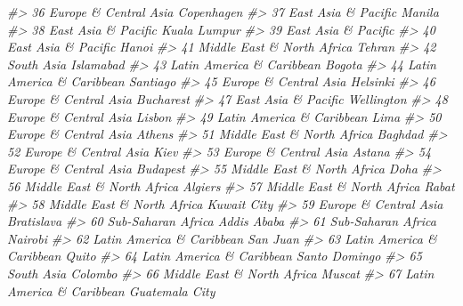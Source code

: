 \documentclass[
  xelatex, ja=standard]{bxjsbook}
\newenvironment{Shaded}{\begin{snugshade}}{\end{snugshade}}
\newcommand{\CommentTok}[1]{\textcolor[rgb]{0.56,0.35,0.01}{\textit{#1}}}
\theoremstyle{definition}
\theoremstyle{definition}
\theoremstyle{definition}
\theoremstyle{definition}
\theoremstyle{remark}
\begin{document}
\begin{Shaded}
\begin{Highlighting}[]
\CommentTok{\#\textgreater{} 36       Europe \& Central Asia          Copenhagen}
\CommentTok{\#\textgreater{} 37         East Asia \& Pacific              Manila}
\CommentTok{\#\textgreater{} 38         East Asia \& Pacific        Kuala Lumpur}
\CommentTok{\#\textgreater{} 39         East Asia \& Pacific                    }
\CommentTok{\#\textgreater{} 40         East Asia \& Pacific               Hanoi}
\CommentTok{\#\textgreater{} 41  Middle East \& North Africa              Tehran}
\CommentTok{\#\textgreater{} 42                  South Asia           Islamabad}
\CommentTok{\#\textgreater{} 43   Latin America \& Caribbean              Bogota}
\CommentTok{\#\textgreater{} 44   Latin America \& Caribbean            Santiago}
\CommentTok{\#\textgreater{} 45       Europe \& Central Asia            Helsinki}
\CommentTok{\#\textgreater{} 46       Europe \& Central Asia           Bucharest}
\CommentTok{\#\textgreater{} 47         East Asia \& Pacific          Wellington}
\CommentTok{\#\textgreater{} 48       Europe \& Central Asia              Lisbon}
\CommentTok{\#\textgreater{} 49   Latin America \& Caribbean                Lima}
\CommentTok{\#\textgreater{} 50       Europe \& Central Asia              Athens}
\CommentTok{\#\textgreater{} 51  Middle East \& North Africa             Baghdad}
\CommentTok{\#\textgreater{} 52       Europe \& Central Asia                Kiev}
\CommentTok{\#\textgreater{} 53       Europe \& Central Asia              Astana}
\CommentTok{\#\textgreater{} 54       Europe \& Central Asia            Budapest}
\CommentTok{\#\textgreater{} 55  Middle East \& North Africa                Doha}
\CommentTok{\#\textgreater{} 56  Middle East \& North Africa             Algiers}
\CommentTok{\#\textgreater{} 57  Middle East \& North Africa               Rabat}
\CommentTok{\#\textgreater{} 58  Middle East \& North Africa         Kuwait City}
\CommentTok{\#\textgreater{} 59       Europe \& Central Asia          Bratislava}
\CommentTok{\#\textgreater{} 60          Sub{-}Saharan Africa         Addis Ababa}
\CommentTok{\#\textgreater{} 61          Sub{-}Saharan Africa             Nairobi}
\CommentTok{\#\textgreater{} 62   Latin America \& Caribbean            San Juan}
\CommentTok{\#\textgreater{} 63   Latin America \& Caribbean               Quito}
\CommentTok{\#\textgreater{} 64   Latin America \& Caribbean       Santo Domingo}
\CommentTok{\#\textgreater{} 65                  South Asia             Colombo}
\CommentTok{\#\textgreater{} 66  Middle East \& North Africa              Muscat}
\CommentTok{\#\textgreater{} 67   Latin America \& Caribbean      Guatemala City}

\end{Highlighting}
\end{Shaded}
\end{document}
